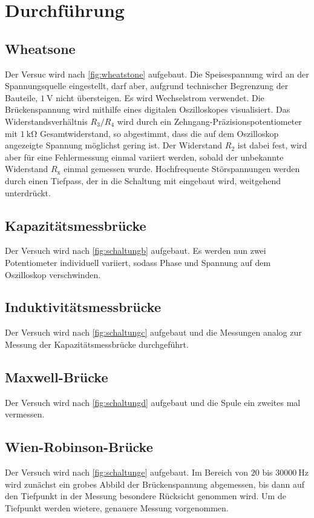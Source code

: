 \section{Durchführung}
\label{sec:Durchführung}

\subsection{Wheatsone}
Der Versuc wird nach \autoref{fig:wheatstone} aufgebaut. Die Speisespannung wird an der Spannungsquelle eingestellt, 
darf aber, aufgrund technischer Begrenzung der Bauteile, $\SI{1}{\volt}$ nicht übersteigen. Es wird Wechselstrom 
verwendet. Die Brückenspannung wird mithilfe eines digitalen Oszilloskopes visualisiert. Das 
Widerstandsverhältnis $R_3/R_4$ wird durch ein Zehngang-Präzisionspotentiometer mit $\SI{1}{\kilo\ohm}$ Gesamtwiderstand,
so abgestimmt, dass die auf dem Oszilloskop angezeigte Spannung möglichst gering ist. Der Widerstand $R_2$ ist dabei fest, 
wird aber für eine Fehlermessung einmal variiert werden, sobald der unbekannte Widerstand $R_{\text{x}}$ einmal gemessen wurde.
Hochfrequente Störspannungen werden durch einen Tiefpass, der in die Schaltung mit eingebaut wird, weitgehend unterdrückt.

\subsection{Kapazitätsmessbrücke}
Der Versuch wird nach \autoref{fig:schaltungb} aufgebaut. Es werden nun zwei Potentiometer individuell variiert, sodass
Phase und Spannung auf dem Oszilloskop verschwinden. 

\subsection{Induktivitätsmessbrücke}
Der Versuch wird nach \autoref{fig:schaltungc} aufgebaut und die Messungen analog zur Messung der Kapazitätsmessbrücke durchgeführt.

\subsection{Maxwell-Brücke}
Der Versuch wird nach \autoref{fig:schaltungd} aufgebaut und die Spule ein zweites mal vermessen.

\subsection{Wien-Robinson-Brücke}
Der Versuch wird nach \autoref{fig:schaltunge} aufgebaut.
Im Bereich von $20$ bis $\SI{30 000}{\hertz}$ wird zunächst ein grobes Abbild der Brückenspannung abgemessen, bis
dann auf den Tiefpunkt in der Messung besondere Rücksicht genommen wird. Um de Tiefpunkt werden wietere, genauere Messung vorgenommen.